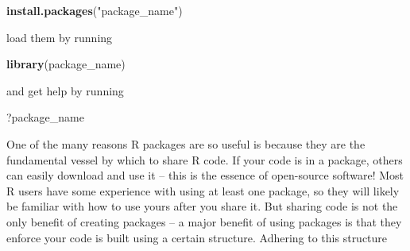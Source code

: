 \documentclass[
]{book}
\newenvironment{Shaded}{\begin{snugshade}}{\end{snugshade}}
\newcommand{\KeywordTok}[1]{\textcolor[rgb]{0.13,0.29,0.53}{\textbf{#1}}}
\newcommand{\NormalTok}[1]{#1}
\newcommand{\StringTok}[1]{\textcolor[rgb]{0.31,0.60,0.02}{#1}}
\begin{document}
\begin{Shaded}
\begin{Highlighting}[]
\KeywordTok{install.packages}\NormalTok{(}\StringTok{"package_name"}\NormalTok{)}
\end{Highlighting}
\end{Shaded}

load them by running

\begin{Shaded}
\begin{Highlighting}[]
\KeywordTok{library}\NormalTok{(package_name)}
\end{Highlighting}
\end{Shaded}

and get help by running

\begin{Shaded}
\begin{Highlighting}[]
\NormalTok{?package_name}
\end{Highlighting}
\end{Shaded}

One of the many reasons R packages are so useful is because they are the fundamental vessel by which to share R code. If your code is in a package, others can easily download and use it -- this is the essence of open-source software! Most R users have some experience with using at least one package, so they will likely be familiar with how to use yours after you share it. But sharing code is not the only benefit of creating packages -- a major benefit of using packages is that they enforce your code is built using a certain structure. Adhering to this structure
\end{document}

